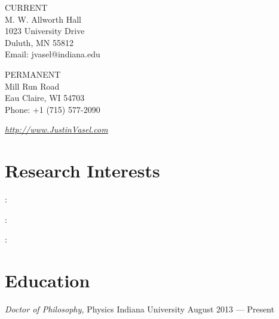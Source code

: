 \documentclass[margin,line,letterpaper]{res}
\begin{document}
\begin{resume}

\vspace{0.2in}

\begin{multicols}{2}
  \textsf{CURRENT} \\
  {\color{light}  M. W. Allworth Hall \\
  1023 University Drive \\
  Duluth, MN 55812 \\
  Email: jvasel{@}indiana.edu \normalfont} \\ 
  \columnbreak
  
  \textsf{PERMANENT} \\
  {\color{light}  Mill Run Road \\
  Eau Claire, WI 54703 \\
  Phone: +1 (715) 577-2090 \normalfont}
\end{multicols}

\vspace{-0.2in}


\large \emph{\href{http://www.justinvasel.com/}{http://www.JustinVasel.com} } \normalsize



\section{Research Interests}

 : 
\itemSep

 : 
\itemSep

 : 

\sectSep



\section{Education}



\object																		
{\emph{Doctor of Philosophy,} Physics}										
{\rm Indiana University}														
{August 2013 --- Present}



\end{resume}
\end{document}
